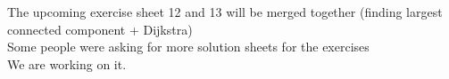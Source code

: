 \begin{frame}{\LectureFeedbackExercisesTitle}
  The upcoming exercise sheet 12 and 13 will be merged
  together (finding largest connected component + Dijkstra)\\
  \vspace{1.0em}
  Some people were asking for more solution sheets for the
  exercises\\
  \vspace{1.0em}
  We are working on it.
\end{frame}
